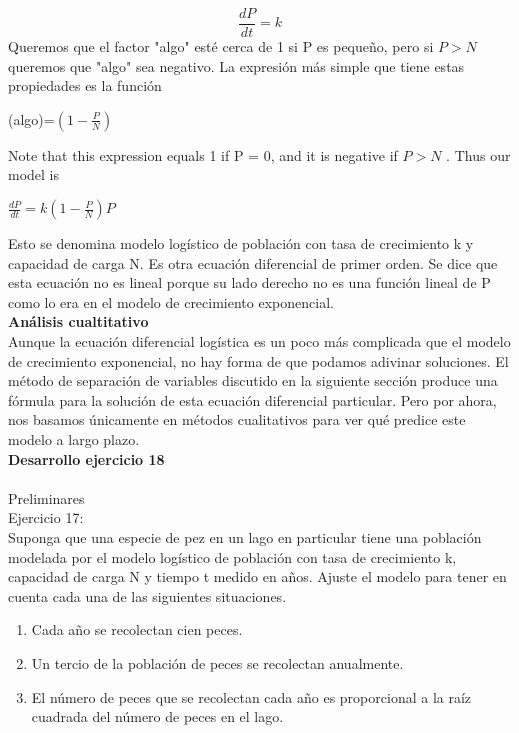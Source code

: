 \documentclass{article}
\begin{document}
\begin{equation*}
    \frac{dP}{dt} = k
\end{equation*}
Queremos que el factor "algo" esté cerca de 1 si P es pequeño, pero si $P> N$
queremos que "algo" sea negativo. La expresión más simple que tiene estas propiedades es la
función
\begin{center}
    (algo)=$(1-\frac{P}{N})$
\end{center}
Note that this expression equals 1 if P = 0, and it is negative if $P > N$ . Thus our model is
\begin{center}
    $\frac{dP}{dt}=k(1-\frac{P}{N})P$
\end{center}
Esto se denomina modelo logístico de población con tasa de crecimiento k y capacidad de carga N. 
Es otra ecuación diferencial de primer orden. Se dice que esta 
ecuación no es lineal porque su lado derecho no es una función lineal de P como lo era en el modelo 
de crecimiento exponencial.
\\ \textbf{Análisis cualtitativo} \\ 
Aunque la ecuación diferencial logística es un poco más complicada que el modelo de crecimiento exponencial, no hay forma de que podamos adivinar soluciones. El método de separación de variables discutido en la siguiente sección produce una fórmula para la solución de esta ecuación diferencial particular. Pero por ahora, nos basamos únicamente en métodos cualitativos para ver qué predice este modelo a largo plazo.
\\ 
\textbf{Desarrollo ejercicio 18}\\ 
\\ 
Preliminares \\ 
Ejercicio 17: \\ 
Suponga que una especie de pez en un lago en particular tiene una población modelada por el modelo logístico 
de población con tasa de crecimiento k, capacidad de carga N y tiempo t medido en años. 
Ajuste el modelo para tener en cuenta cada una de las siguientes situaciones.
\begin{enumerate}
    \item Cada año se recolectan cien peces.
    \item Un tercio de la población de peces se recolectan anualmente.
    \item El número de peces que se recolectan cada año es proporcional a la raíz 
    cuadrada del número de peces en el lago.   
\end{enumerate}
\end{document}
